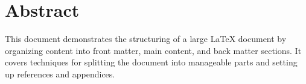 \chapter*{Abstract}
This document demonstrates the structuring of a large LaTeX document by organizing content into front matter, main content, and back matter sections. It covers techniques for splitting the document into manageable parts and setting up references and appendices.
